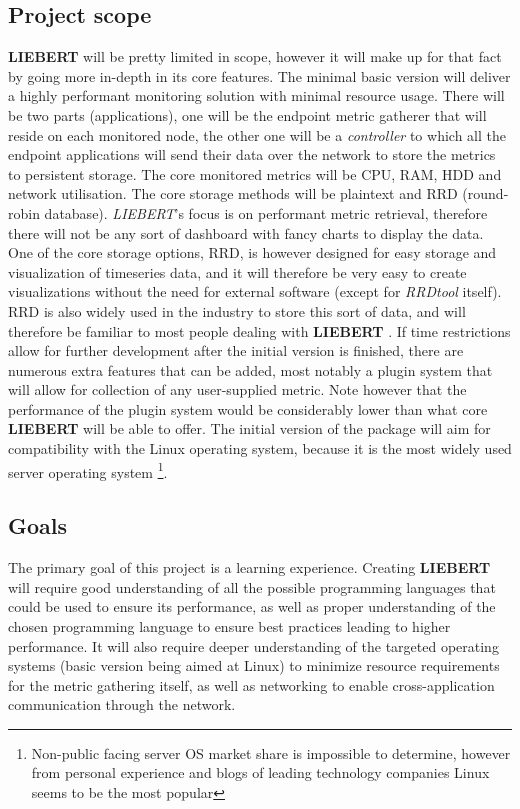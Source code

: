 \documentclass[12pt,a4paper,table]{article}
\begin{document}
        \subsection{Project scope}\label{sec:scope}
            \textbf{LIEBERT} will be pretty limited in scope, however it will make up for that fact by going more in-depth in its core features. The minimal basic version will deliver a highly performant monitoring solution with minimal resource usage. There will be two parts (applications), one will be the endpoint metric gatherer that will reside on each monitored node, the other one will be a \textit{controller} to which all the endpoint applications will send their data over the network to store the metrics to persistent storage. The core monitored metrics will be CPU, RAM, HDD and network utilisation. The core storage methods will be plaintext and RRD (round-robin database). \textit{LIEBERT}'s focus is on performant metric retrieval, therefore there will not be any sort of dashboard with fancy charts to display the data. One of the core storage options, RRD, is however designed for easy storage and visualization of timeseries data, and it will therefore be very easy to create visualizations without the need for external software (except for \textit{RRDtool} itself). RRD is also widely used in the industry to store this sort of data, and will therefore be familiar to most people dealing with \textbf{LIEBERT} \citep{rrdtool}. If time restrictions allow for further development after the initial version is finished, there are numerous extra features that can be added, most notably a plugin system that will allow for collection of any user-supplied metric. Note however that the performance of the plugin system would be considerably lower than what core \textbf{LIEBERT} will be able to offer. The initial version of the package will aim for compatibility with the Linux operating system, because it is the most widely used server operating system \citep{systempop}\footnote{Non-public facing server OS market share is impossible to determine, however from personal experience and blogs of leading technology companies Linux seems to be the most popular}.

        \subsection{Goals}
            The primary goal of this project is a learning experience. Creating \textbf{LIEBERT} will require good understanding of all the possible programming languages that could be used to ensure its performance, as well as proper understanding of the chosen programming language to ensure best practices leading to higher performance. It will also require deeper understanding of the targeted operating systems (basic version being aimed at Linux) to minimize resource requirements for the metric gathering itself, as well as networking to enable cross-application communication through the network.
            
\end{document}
